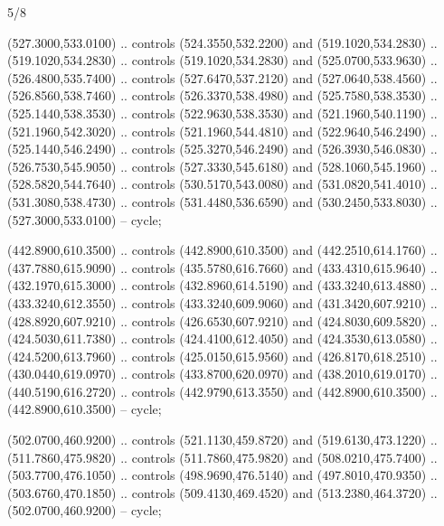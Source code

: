 \begin{flagdescription}{5/8}
\begin{scope}[shift={(m)}]
\begin{scope}[scale=\flagwidth/220,y=0.1mm, x=0.1mm, yscale=-1,shift={(-596,-360)}]
\begin{scope}[draw=black,line join=round,line cap=round,line width=0.381\lw]
\begin{scope}[line width=0.534\lw,fill=green]
 (527.3000,533.0100) .. controls (524.3550,532.2200) and
  (519.1020,534.2830) .. (519.1020,534.2830) .. controls (519.1020,534.2830) and
  (525.0700,533.9630) .. (526.4800,535.7400) .. controls (527.6470,537.2120) and
  (527.0640,538.4560) .. (526.8560,538.7460) .. controls (526.3370,538.4980) and
  (525.7580,538.3530) .. (525.1440,538.3530) .. controls (522.9630,538.3530) and
  (521.1960,540.1190) .. (521.1960,542.3020) .. controls (521.1960,544.4810) and
  (522.9640,546.2490) .. (525.1440,546.2490) .. controls (525.3270,546.2490) and
  (526.3930,546.0830) .. (526.7530,545.9050) .. controls (527.3330,545.6180) and
  (528.1060,545.1960) .. (528.5820,544.7640) .. controls (530.5170,543.0080) and
  (531.0820,541.4010) .. (531.3080,538.4730) .. controls (531.4480,536.6590) and
  (530.2450,533.8030) .. (527.3000,533.0100) -- cycle;

 (442.8900,610.3500) .. controls (442.8900,610.3500) and
  (442.2510,614.1760) .. (437.7880,615.9090) .. controls (435.5780,616.7660) and
  (433.4310,615.9640) .. (432.1970,615.3000) .. controls (432.8960,614.5190) and
  (433.3240,613.4880) .. (433.3240,612.3550) .. controls (433.3240,609.9060) and
  (431.3420,607.9210) .. (428.8920,607.9210) .. controls (426.6530,607.9210) and
  (424.8030,609.5820) .. (424.5030,611.7380) .. controls (424.4100,612.4050) and
  (424.3530,613.0580) .. (424.5200,613.7960) .. controls (425.0150,615.9560) and
  (426.8170,618.2510) .. (430.0440,619.0970) .. controls (433.8700,620.0970) and
  (438.2010,619.0170) .. (440.5190,616.2720) .. controls (442.9790,613.3550) and
  (442.8900,610.3500) .. (442.8900,610.3500) -- cycle;

 (502.0700,460.9200) .. controls (521.1130,459.8720) and
  (519.6130,473.1220) .. (511.7860,475.9820) .. controls (511.7860,475.9820) and
  (508.0210,475.7400) .. (503.7700,476.1050) .. controls (498.9690,476.5140) and
  (497.8010,470.9350) .. (503.6760,470.1850) .. controls (509.4130,469.4520) and
  (513.2380,464.3720) .. (502.0700,460.9200) -- cycle;


\end{scope}
\end{scope}
\end{scope}
\end{scope}
\end{flagdescription}
